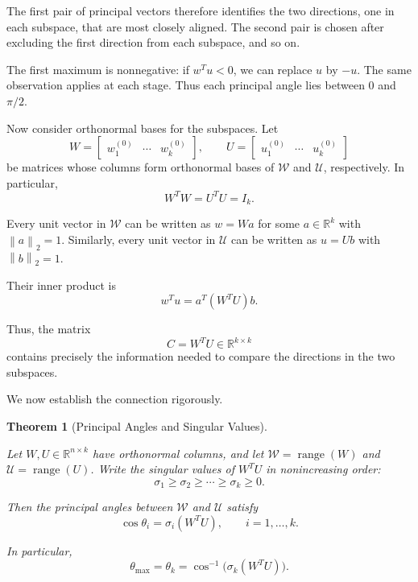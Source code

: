 \documentclass[14pt,letterpaper]{article}
\theoremstyle{plain}
\newtheorem{theorem}{Theorem}[section]
\theoremstyle{definition}
\theoremstyle{remark}
\newcommand{\R}{\mathbb{R}}
\newcommand{\norm}[1]{\left\lVert #1 \right\rVert}
\DeclareMathOperator{\range}{range}
\begin{document}
The first pair of principal vectors therefore identifies
the two directions, one in each subspace, that are most
closely aligned. The second pair is chosen after excluding
the first direction from each subspace, and so on.

The first maximum is nonnegative: if $w^Tu<0$, we can
replace $u$ by $-u$. The same observation applies at each
stage. Thus each principal angle lies between $0$ and
$\pi/2$.

Now consider orthonormal bases for the subspaces.
Let
\[
W=\begin{bmatrix}w^{(0)}_1&\cdots&w^{(0)}_k\end{bmatrix},
\qquad
U=\begin{bmatrix}u^{(0)}_1&\cdots&u^{(0)}_k\end{bmatrix}
\]
be matrices whose columns form orthonormal bases of
$\mathcal W$ and $\mathcal U$, respectively. In particular,
\[
W^TW=U^TU=I_k.
\]

Every unit vector in $\mathcal W$ can be written as
$w=Wa$ for some $a\in\R^k$ with $\norm{a}_2=1$.
Similarly, every unit vector in $\mathcal U$ can be
written as $u=Ub$ with $\norm{b}_2=1$.

Their inner product is
\[
\boxed{w^Tu=a^T(W^TU)b.}
\]

Thus, the matrix
\[
\boxed{C=W^TU\in\R^{k\times k}}
\]
contains precisely the information needed to compare
the directions in the two subspaces.

We now establish the connection rigorously.

\begin{theorem}[Principal Angles and Singular Values]
\label{thm:principal_angles_svd}

Let $W,U\in\R^{n\times k}$ have orthonormal columns,
and let $\mathcal W=\range(W)$ and
$\mathcal U=\range(U)$. Write the singular values of
$W^TU$ in nonincreasing order:
\[
\sigma_1\geq\sigma_2\geq\cdots\geq\sigma_k\geq0.
\]

Then the principal angles between $\mathcal W$ and
$\mathcal U$ satisfy
\[
\boxed{\cos\theta_i=\sigma_i(W^TU),
\qquad i=1,\ldots,k.}
\]

In particular,
\[
\boxed{\theta_{\max}=\theta_k
=\cos^{-1}\bigl(\sigma_k(W^TU)\bigr).}
\]

\end{theorem}
\end{document}
